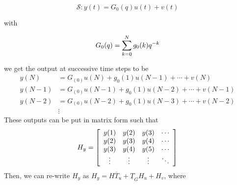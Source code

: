 \begin{equation*}
\mathcal{S}: y(t) = G_0(q)u(t)+v(t)
\end{equation*}

with

\begin{equation*}
G_0(q)=\sum_{k=0}^N g_0(k)q^{-k}
\end{equation*}

we get the output at successive time steps to be
\begin{align*}
y(N) &= G_(0)u(N) + g_0(1)u(N-1) + \cdots + v(N) \\
y(N-1) &= G_(0)u(N-1) + g_0(1)u(N-2) + \cdots + v(N-1) \\
y(N-2) &= G_(0)u(N-2) + g_0(1)u(N-3) + \cdots + v(N-2) \\
&\vdots
\end{align*}
These outputs can be put in matrix form such that
\begin{align*}
H_y = \left[\begin{array}{c c c c}
y(1) & y(2) & y(3) & \cdots \\
y(2) & y(3) & y(4) & \cdots \\
y(3) & y(4) & y(5) & \cdots \\
\vdots & \vdots & \vdots & \ddots
\end{array}\right]
\end{align*}
Then, we can re-write $H_y$ as $H_y=H\overline{T}_u+\underline{T}_G H_u+H_v$, where
